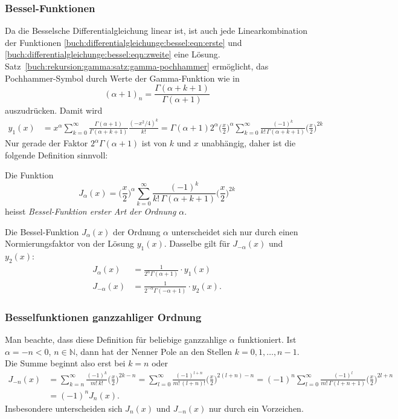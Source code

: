 %
%
\subsubsection{Bessel-Funktionen}
Da die Besselsche Differentialgleichung linear ist, ist auch
jede Linearkombination der Funktionen
\eqref{buch:differentialgleichunge:bessel:eqn:erste}
und
\eqref{buch:differentialgleichunge:bessel:eqn:zweite}
eine Lösung.
Satz~\ref{buch:rekursion:gamma:satz:gamma-pochhammer}
ermöglicht, das Pochhammer-Symbol durch Werte der Gamma-Funktion
wie in
\[
(\alpha+1)_n = \frac{\Gamma(\alpha+k+1)}{\Gamma(\alpha+1)}
\]
auszudrücken.
Damit wird
\begin{align}
y_1(x)
&=
x^\alpha
\sum_{k=0}^\infty
\frac{\Gamma(\alpha+1)}{\Gamma(\alpha+k+1)}
\frac{(-x^2/4)^k}{k!}
=
\Gamma(\alpha+1) 2^{\alpha}
\biggl(\frac{x}{2}\biggr)^\alpha
\sum_{k=0}^\infty
\frac{(-1)^k}{k!\,\Gamma(\alpha+k+1)} \biggl(\frac{x}{2}\biggr)^{2k}
\label{buch:differentialgleichungen:bessel:normierungsgleichung}
\end{align}
Nur gerade der Faktor $2^\alpha\Gamma(\alpha+1)$ ist von $k$ und $x$ 
unabhängig, daher ist die folgende Definition sinnvoll:

\begin{definition}
\label{buch:differentialgleichungen:bessel:definition}
Die Funktion
\[
J_{\alpha}(x)
=
\biggl(\frac{x}{2}\biggr)^\alpha
\sum_{k=0}^\infty
\frac{(-1)^k}{k!\,\Gamma(\alpha+k+1)}
\biggl(\frac{x}{2}\biggr)^{2k}
\]
heisst {\em Bessel-Funktion erster Art der Ordnung $\alpha$}.
%
\end{definition}

Die Bessel-Funktion $J_\alpha(x)$ der Ordnung $\alpha$ unterscheidet sich
nur durch einen Normierungsfaktor von der Lösung $y_1(x)$.
Dasselbe gilt für $J_{-\alpha}(x)$ und $y_2(x)$:
\begin{align*}
J_{\alpha}(x)
&=
\frac{1}{2^\alpha\Gamma(\alpha+1)}
\cdot
y_1(x)
\\
J_{-\alpha}(x)
&=
\frac{1}{2^{-\alpha}\Gamma(-\alpha+1)}
\cdot
y_2(x).
\end{align*}

%
%
\subsubsection{Besselfunktionen ganzzahliger Ordnung}
Man beachte, dass diese Definition für beliebige ganzzahlige 
$\alpha$ funktioniert.
Ist $\alpha=-n<0$, $n\in\mathbb{N}$, dann hat der Nenner Pole 
an den Stellen $k=0,1,\dots,n-1$.
Die Summe beginnt also erst bei $k=n$ oder
\begin{align*}
J_{-n}(x)
&=
\sum_{k=n}^\infty \frac{(-1)^k}{m!\,k!}\biggl(\frac{x}{2}\biggr)^{2k-n}
=
\sum_{l=0}^\infty
\frac{(-1)^{l+n}}{m!\,(l+n)!}\biggl(\frac{x}{2}\biggr)^{2(l+n)-n}
=
(-1)^n
\sum_{l=0}^\infty
\frac{(-1)^l}{m!\,\Gamma(l+n+1)}\biggl(\frac{x}{2}\biggr)^{2l+n}
\\
&=
(-1)^n
J_{n}(x).
\end{align*}
Insbesondere unterscheiden sich $J_n(x)$ und $J_{-n}(x)$ nur durch
ein Vorzeichen.

